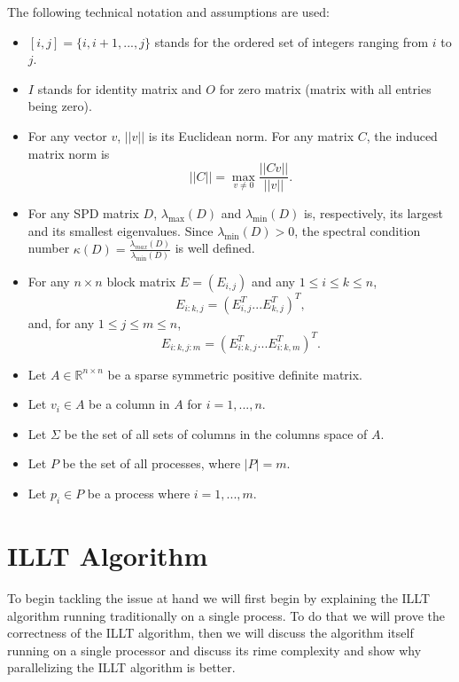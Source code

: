\documentclass[11pt]{article}
\theoremstyle{definition}
\begin{document}
The following technical notation and assumptions are used:
\begin{itemize}
\item $[i,j]=\{i,i+1,...,j\}$ stands for the ordered set of integers ranging from $i$ to $j$.
\item $I$ stands for identity matrix and $O$ for zero matrix (matrix with all entries being zero).
\item For any vector $v$, $||v||$ is its Euclidean norm. For any matrix $C$, the induced matrix norm is
\begin{equation*}
||C||=\max_{v\neq 0}\frac{||Cv||}{||v||}.
\end{equation*}
\item For any SPD matrix $D$, $\lambda_{\max}(D)$ and $\lambda_{\min}(D)$ is, respectively, its largest and its smallest eigenvalues. Since $\lambda_{\min}(D)>0$, the spectral condition number $\kappa(D)=\frac{\lambda_{max}(D)}{\lambda_{\min}(D)}$ is well defined.
\item For any $n\times n$ block matrix $E=(E_{i,j})$ and any $1\leq i\leq k\leq n$,
\begin{equation*}
E_{i:k,j}=(E^T_{i,j}...E^T_{k,j})^T,
\end{equation*}
and, for any $1\leq j\leq m\leq n$,
\begin{equation*}
E_{i:k,j:m}=(E^T_{i:k,j}...E^T_{i:k,m})^T.
\end{equation*}
\item Let $A\in\mathbb{R}^{n\times n}$ be a sparse symmetric positive definite matrix.
\item Let $v_i\in A$ be a column in $A$ for $i=1,...,n$.
\item Let $\Sigma$ be the set of all sets of columns in the columns space of $A$.
\item Let $P$ be the set of all processes, where $|P|=m$.
\item Let $p_i\in P$ be a process where $i=1,...,m$.
\end{itemize}

\section{ILLT Algorithm}
To begin tackling the issue at hand we will first begin by explaining the ILLT algorithm running traditionally on a single process. To do that we will prove the correctness of the ILLT algorithm, then we will discuss the algorithm itself running on a single processor and discuss its rime complexity and show why parallelizing the ILLT algorithm is better.
\end{document}
